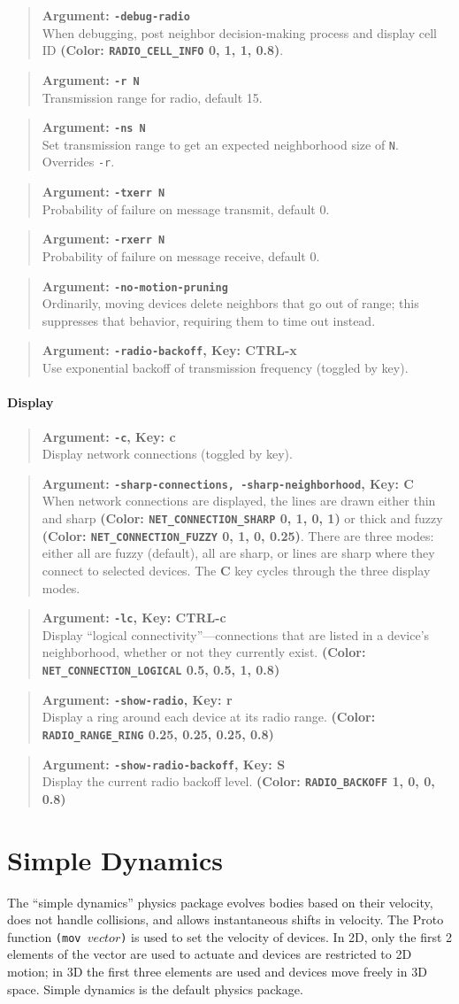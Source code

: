 \documentclass{article}
\newcommand\var[1]{{\tt #1}}
\newcommand\key[1]{{\bf #1}}
\newcommand\simarg[2]{\begin{quote} {\bf Argument: \var{#1}} \\ #2 \end{quote}}
\newcommand\simargkey[3]{
  \begin{quote} {\bf Argument: \var{#1}, Key: \key{#2}} \\ #3 \end{quote}
}
\newcommand\color[5]{{\bf (Color: {\tt #1} #2, #3, #4, #5)}} %
\begin{document}
\simarg{-debug-radio}{When debugging, post neighbor decision-making
  process and display cell ID
  \color{RADIO\_CELL\_INFO}{0}{1}{1}{0.8}.}

\simarg{-r N}{Transmission range for radio, default 15.}
\simarg{-ns N}{Set transmission range to get an expected neighborhood
  size of \var{N}.  Overrides \var{-r}.}
\simarg{-txerr N}{Probability of failure on message transmit, default 0.}
\simarg{-rxerr N}{Probability of failure on message receive, default 0.}

\simarg{-no-motion-pruning}{Ordinarily, moving devices delete
  neighbors that go out of range; this suppresses that behavior,
  requiring them to time out instead.}

\simargkey{-radio-backoff}{CTRL-x}{Use exponential backoff of
  transmission frequency (toggled by key).}

\paragraph{Display}
\simargkey{-c}{c}{Display network connections (toggled by key).}
\simargkey{-sharp-connections, -sharp-neighborhood}{C}{When network 
  connections are displayed, the lines are drawn either thin and sharp
  \color{NET\_CONNECTION\_SHARP}{0}{1}{0}{1} or thick and fuzzy
  \color{NET\_CONNECTION\_FUZZY}{0}{1}{0}{0.25}.  There are three modes:
  either all are fuzzy (default), all are sharp, or lines are sharp where
  they connect to selected devices.  The \key{C} key cycles through the
  three display modes.}
\simargkey{-lc}{CTRL-c}{Display ``logical connectivity''---connections
  that are listed in a device's neighborhood, whether or not they currently
  exist.  \color{NET\_CONNECTION\_LOGICAL}{0.5}{0.5}{1}{0.8}}
\simargkey{-show-radio}{r}{Display a ring around each device at its radio
  range. \color{RADIO\_RANGE\_RING}{0.25}{0.25}{0.25}{0.8}}
\simargkey{-show-radio-backoff}{S}{Display the current radio backoff level.
  \color{RADIO\_BACKOFF}{1}{0}{0}{0.8}}


\section{Simple Dynamics}

The ``simple dynamics'' physics package evolves bodies based on their
velocity, does not handle collisions, and allows instantaneous shifts
in velocity.  The Proto function \var{(mov $vector$)} is used to set
the velocity of devices.  In 2D, only the first 2 elements of the
vector are used to actuate and devices are restricted to 2D motion; in
3D the first three elements are used and devices move freely in 3D
space.  Simple dynamics is the default physics package.
\end{document}
